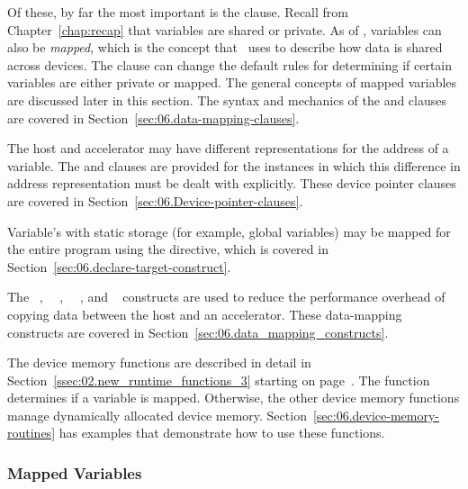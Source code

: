 Of these, by far the most important is the  clause.  Recall from
Chapter~\ref{chap:recap} that variables are shared or private.  As of \OMPfourzero,
variables can also be \emph{mapped}, which is the concept that \OMP\ uses to
describe how data is shared across devices.  The  clause can
change the default rules for determining if certain variables are either
private or mapped.  The general concepts of mapped variables
are discussed later in this section.  
The syntax and mechanics of the  and  clauses
are covered in Section~\ref{sec:06.data-mapping-clauses}.

The host and accelerator may have different representations for the address of
a variable.  The  and  clauses are
provided for the instances in which this difference in address representation
must be dealt with explicitly.  These device pointer clauses are covered in
Section~\ref{sec:06.Device-pointer-clauses}.

Variable's with static storage (for example, global variables) may be mapped
for the entire program using the  directive, which is
covered in Section~\ref{sec:06.declare-target-construct}.

The ~, ~~,
~~, and ~
constructs are used to reduce the performance overhead of copying data between
the host and an accelerator.  These data-mapping constructs are
covered in Section~\ref{sec:06.data_mapping_constructs}.

The device memory functions are described in detail in
Section~\ref{ssec:02.new_runtime_functions_3} starting on
page~\pageref{ssec:02.new_runtime_functions_3}.  
The  function determines if a variable
is mapped.  Otherwise, the other device memory functions 
manage dynamically allocated device memory.  
Section~\ref{sec:06.device-memory-routines} has examples 
that demonstrate how to use these functions.

\subsubsection{Mapped Variables}
\label{ssec:06.mapped-variables}

